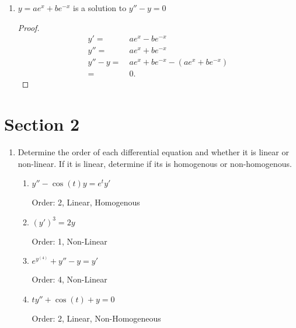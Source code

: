 \documentclass[12pt]{article}
\begin{document}
\begin{enumerate}
\begin{enumerate}
    \item \(y = ae^x + be^{-x}\) is a solution to \(y'' - y = 0\)
    \begin{proof}
      \begin{align*}
        y' = & \ ae^x - be^{-x} \\
        y'' = & \ ae^x + be^{-x} \\
        y'' - y = & \ ae^x + be^{-x} - (ae^x + be^{-x}) \\
        = & \ 0.
      \end{align*}
    \end{proof}

  \end{enumerate}
  
\end{enumerate}


\pagebreak
\section*{Section 2}

\begin{enumerate}
  \item Determine the order of each differential equation and whether it is linear or non-linear. If it is linear, determine if its is homogenous or non-homogenous.
  \begin{enumerate}
    \item \(y'' - \cos(t)y = e^{t}y'\)
    
    Order: 2, Linear, Homogenous

    \item \({(y')}^3 = 2y\)
    
    Order: 1, Non-Linear

    \item \(e^{y^{(4)}} + y'' - y = y'\)
    
    Order: 4, Non-Linear

    \item \(ty'' + \cos(t) + y = 0\)
    
    Order: 2, Linear, Non-Homogeneous

  \end{enumerate} 
\end{enumerate}
\end{document}
